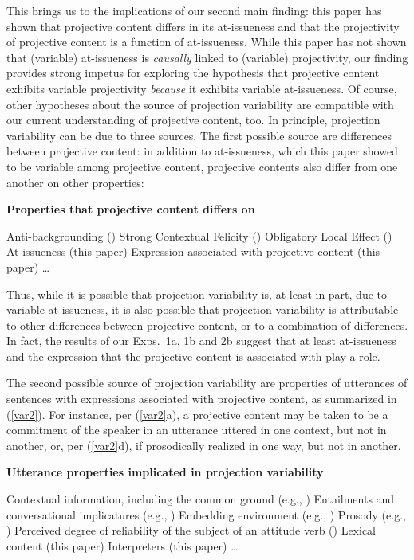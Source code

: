 \documentclass[11pt,fleqn]{article}
\newcommand{\6}{\mbox{$[\hspace*{-.6mm}[$}}
\newcommand{\9}{\mbox{$]\hspace*{-.6mm}]$}}
\begin{document}
This brings us to the implications of our second main finding: this paper has shown that projective content differs in its at-issueness and that the projectivity of projective content is a function of at-issueness. While this paper has not shown that (variable) at-issueness is {\em causally} linked to (variable) projectivity, our finding provides strong impetus for exploring the hypothesis that projective content exhibits variable projectivity {\em because} it exhibits variable at-issueness. Of course, other hypotheses about the source of projection variability are compatible with our current understanding of projective content, too. In principle, projection variability can be due to three sources. The first possible source are differences between projective content: in addition to at-issueness, which this paper showed to be variable among projective content, projective contents also differ from one another on other properties:

\begin{exe}
\ex\label{var1} {\bf Properties that projective content differs on}
\begin{xlist}
\ex Anti-backgrounding (\citealt{potts05}) 
\ex Strong Contextual Felicity (\citealt{brst-lang11}) 
\ex Obligatory Local Effect (\citealt{brst-lang11}) 
\ex At-issueness (this paper) 
\ex Expression associated with projective content (this paper) 
\ex \ldots 
\end{xlist}
\end{exe}
Thus, while it is possible that projection variability is, at least in part, due to variable at-issueness, it is also possible that projection variability is attributable to other differences between projective content, or to a combination of differences. In fact, the results of our Exps.~1a, 1b and 2b suggest that at least at-issueness and the expression that the projective content is associated with play a role.


The second possible source of projection variability are properties of utterances of sentences with expressions associated with projective content, as summarized in (\ref{var2}). For instance, per (\ref{var2}a), a projective content may be taken to be a commitment of the speaker in an utterance uttered in one context, but not in another, or, per (\ref{var2}d), if prosodically realized in one way, but not in another. 

\begin{exe}
\ex\label{var2} {\bf Utterance properties implicated in projection variability}
\begin{xlist}
\ex Contextual information, including the common ground (e.g., \citealt{gazdar79a,gazdar79b})
\ex Entailments and conversational implicatures (e.g., \citealt{gazdar79a,gazdar79b})
\ex Embedding environment (e.g., \citealt{smith-hall-cls})
\ex Prosody (e.g., \citealt{abrusan2011,cummins-rohde2015,tonhauser-salt26,stevens-etal2017}) 
\ex Perceived degree of reliability of the subject of an attitude verb (\citealt{schlenker10})
\ex Lexical content (this paper)
\ex Interpreters (this paper)
\ex \ldots 
\end{xlist}
\end{exe}
\end{document}
